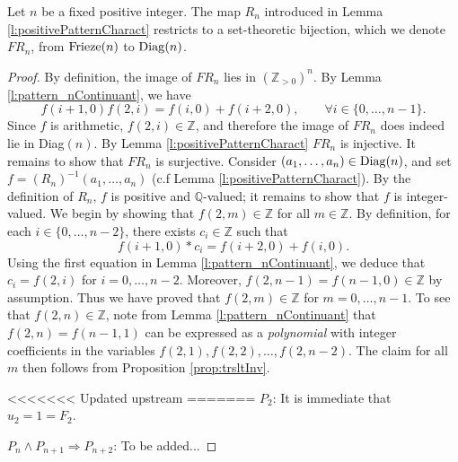 \iffalse
\begin{proposition}
    \label{prop:testCriteria}
    Let $n$ be a fixed positive integer. The map $R_n$ introduced in Lemma \ref{l:positivePatternCharact} restricts 
    to a set-theoretic bijection, which we denote $FR_n$, from ${\rm Frieze}(n)$ to ${\rm Diag}(n)$. 
\end{proposition}
\begin{proof}
    By definition, the image of $FR_n$ lies in $(\mathbb{Z}_{>0})^n$. By Lemma \ref{l:pattern_nContinuant}, we have 
    \[
        f (i+1,0) f (2,i) = f (i,0) + f (i+2, 0), \qquad \forall i \in \{0,\ldots, n-1\}.
    \]
    Since $f$ is arithmetic, $f (2,i) \in \mathbb{Z}$, and therefore the image of $FR_n$ does indeed lie in Diag$(n)$. 
    By Lemma \ref{l:positivePatternCharact} $FR_n$ is injective. It 
    remains to show that $FR_n$ is surjective. Consider $(a_1, \ldots, a_n) \in {\rm Diag}(n)$, and set $f = (R_n)^{-1}(a_1, \ldots, a_n)$ 
    (c.f Lemma \ref{l:positivePatternCharact}). By the definition of $R_n$, $f$ is positive and $\mathbb{Q}$-valued; 
    it remains to show that $f$ is integer-valued. We begin by showing that $f (2,m) \in \mathbb{Z}$ for all $m \in \mathbb{Z}$. 
    By definition, for each 
    $i \in \{0,\ldots, n-2\}$, there exists $c_i \in \mathbb{Z}$ such that
    \[
        f(i+1,0) * c_i = f (i+2,0) + f (i,0).    
    \]
    Using the first equation in Lemma \ref{l:pattern_nContinuant}, we deduce that $c_i = f(2,i)$ for $i =0, \ldots, n-2$. 
    Moreover, $ f (2,n-1) = f (n-1,0) \in \mathbb{Z}$ by assumption. Thus we have proved that 
    $f (2,m) \in \mathbb{Z}$ for $m = 0, \ldots, n-1$. To see that $f (2,n) \in \mathbb{Z}$, note from 
    Lemma \ref{l:pattern_nContinuant} that $f (2,n) = f (n-1,1)$ can be expressed as a {\it polynomial} with 
    integer coefficients in the variables $f (2,1), f (2,2),\ldots , f (2,n-2)$. The claim for all $m$ then follows from 
    Proposition \ref{prop:trsltInv}. 

<<<<<<< Updated upstream
=======
    $P_2$: It is immediate that $u_2 = 1 = F_2$.  

    $P_n \wedge P_{n+1} \Rightarrow P_{n+2}$: To be added...
\end{proof}


